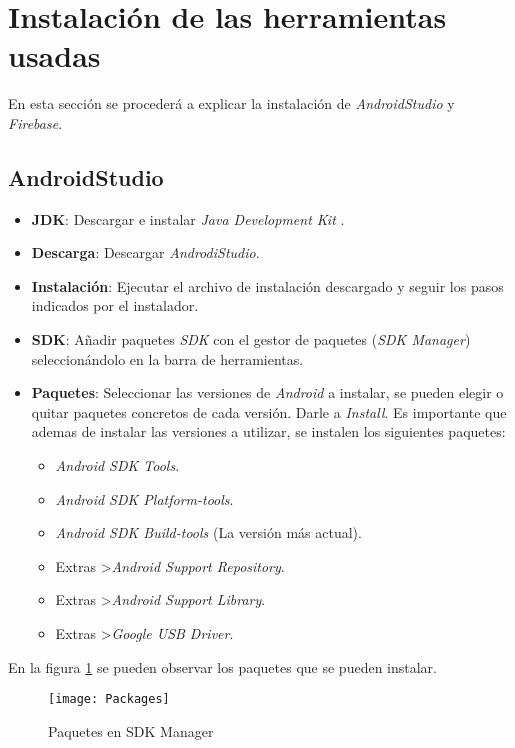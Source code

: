 	\section{Instalación de las herramientas usadas}
	En esta sección se procederá a explicar la instalación de {\it AndroidStudio} y {\it Firebase}.
	
	\subsection{AndroidStudio}
	\begin{itemize}
		\item {\bf JDK}: Descargar e instalar {\it Java Development Kit} \cite{17:jdk:online}.
		\item {\bf Descarga}: Descargar {\it AndrodiStudio}.
		\item {\bf Instalación}: Ejecutar el archivo de instalación descargado y seguir los pasos indicados por el instalador.
		\item {\bf SDK}: Añadir paquetes {\it SDK} con el gestor de paquetes ({\it SDK Manager}) seleccionándolo en la barra de herramientas.
		\item {\bf Paquetes}: Seleccionar las versiones de {\it Android} \cite{2:android:online} a instalar, se pueden elegir o quitar paquetes concretos de cada versión. Darle a {\it Install}. Es importante que ademas de instalar las versiones a utilizar, se instalen los siguientes paquetes:
		\begin{itemize}
			\item {\it Android SDK Tools}.
			\item {\it Android SDK Platform-tools}.
			\item {\it Android SDK Build-tools} (La versión más actual).
			\item Extras \textgreater {\it Android Support Repository}.
			\item Extras \textgreater {\it Android Support Library}.
			\item Extras \textgreater {\it Google USB Driver}.
		\end{itemize}
	\end{itemize}
	
	En la figura \ref{fig:SdkManagerPackages} se pueden observar los paquetes que se pueden instalar.
	
	\begin{figure}[h !]
		\centering
		\texttt{[image: Packages]}
		\caption{Paquetes en SDK Manager}
		\label{fig:SdkManagerPackages}
	\end{figure}
	
